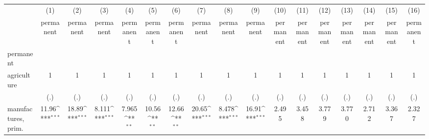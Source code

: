 {
\def\sym#1{\ifmmode^{#1}\else\(^{#1}\)\fi}
\begin{tabular}{l*{16}{c}}
\hline\hline
                    &\multicolumn{1}{c}{(1)}&\multicolumn{1}{c}{(2)}&\multicolumn{1}{c}{(3)}&\multicolumn{1}{c}{(4)}&\multicolumn{1}{c}{(5)}&\multicolumn{1}{c}{(6)}&\multicolumn{1}{c}{(7)}&\multicolumn{1}{c}{(8)}&\multicolumn{1}{c}{(9)}&\multicolumn{1}{c}{(10)}&\multicolumn{1}{c}{(11)}&\multicolumn{1}{c}{(12)}&\multicolumn{1}{c}{(13)}&\multicolumn{1}{c}{(14)}&\multicolumn{1}{c}{(15)}&\multicolumn{1}{c}{(16)}\\
                    &\multicolumn{1}{c}{permanent}&\multicolumn{1}{c}{permanent}&\multicolumn{1}{c}{permanent}&\multicolumn{1}{c}{permanent}&\multicolumn{1}{c}{permanent}&\multicolumn{1}{c}{permanent}&\multicolumn{1}{c}{permanent}&\multicolumn{1}{c}{permanent}&\multicolumn{1}{c}{permanent}&\multicolumn{1}{c}{permanent}&\multicolumn{1}{c}{permanent}&\multicolumn{1}{c}{permanent}&\multicolumn{1}{c}{permanent}&\multicolumn{1}{c}{permanent}&\multicolumn{1}{c}{permanent}&\multicolumn{1}{c}{permanent}\\
\hline
permanent           &                     &                     &                     &                     &                     &                     &                     &                     &                     &                     &                     &                     &                     &                     &                     &                     \\
agriculture         &           1         &           1         &           1         &           1         &           1         &           1         &           1         &           1         &           1         &           1         &           1         &           1         &           1         &           1         &           1         &           1         \\
                    &         (.)         &         (.)         &         (.)         &         (.)         &         (.)         &         (.)         &         (.)         &         (.)         &         (.)         &         (.)         &         (.)         &         (.)         &         (.)         &         (.)         &         (.)         &         (.)         \\
[1em]
manufactures, prim. &       11.96\sym{***}&       18.89\sym{***}&       8.111\sym{***}&       7.965\sym{**} &       10.56\sym{**} &       12.66\sym{**} &       20.65\sym{***}&       8.478\sym{***}&       16.91\sym{***}&       2.495         &       3.458         &       3.779         &       3.770         &       2.712         &       3.367         &       2.327         \\

\end{tabular}}
